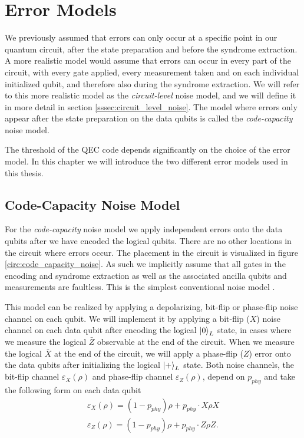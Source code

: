 


\chapter{Error Models}\label{chapter:error_models}

We previously assumed that errors can only occur at a specific point in our quantum circuit, after the state preparation and before the syndrome extraction. 
A more realistic model would assume that errors can occur in every part of the circuit, with every gate applied, every measurement taken and on each individual initialized qubit, and therefore also during the syndrome extraction.
We will refer to this more realistic model as the \emph{circuit-level} noise model, and we will define it in more detail in section \ref{sssec:circuit_level_noise}. 
The model where errors only appear after the state preparation on the data qubits is called the \emph{code-capacity} noise model.

The threshold of the QEC code depends significantly on the choice of the error model.
In this chapter we will introduce the two different error models used in this thesis.

\section{Code-Capacity Noise Model}\label{sssec:code_capacity_error_model}

For the \emph{code-capacity} noise model we apply independent errors onto the data qubits after we have encoded the logical qubits.
There are no other locations in the circuit where errors occur.
The placement in the circuit is visualized in figure \ref{circ:code_capacity_noise}.
As such we implicitly assume that all gates in the encoding and syndrome extraction as well as the associated ancilla qubits and measurements are faultless.
This is the simplest conventional noise model \cite{mld_decoding_intro_luis}. 

This model can be realized by applying a depolarizing, bit-flip or phase-flip noise channel on each qubit. 
We will implement it by applying a bit-flip ($X$) noise channel on each data qubit after encoding the logical $\ket{0}_L$ state, in cases where we measure the logical $\bar{Z}$ observable at the end of the circuit.
When we measure the logical $\bar{X}$ at the end of the circuit, we will apply a phase-flip ($Z$) error onto the data qubits after initializing the logical $\ket{+}_L$ state.
Both noise channels, the bit-flip channel $\varepsilon_X(\rho)$ and phase-flip channel $\varepsilon_Z(\rho)$, depend on $p_{phy}$ and take the following form on each data qubit 
\begin{align}
    \varepsilon_{X}(\rho) = (1-p_{phy}) \rho + p_{phy} \cdot X \rho X \label{eq:bit_flip_channel}\\
    \varepsilon_{Z}(\rho) = (1-p_{phy}) \rho + p_{phy} \cdot Z \rho Z \label{eq:phase_flip_channel}.
\end{align}

